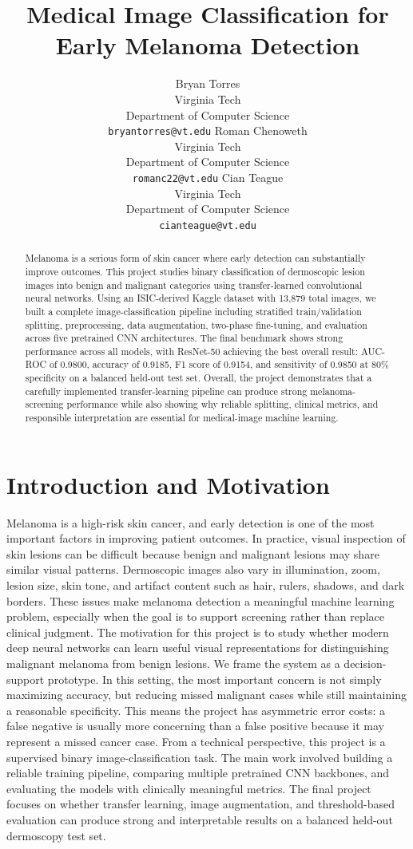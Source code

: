 \documentclass{article}
\title{Medical Image Classification for Early Melanoma Detection}
\author{%
  Bryan Torres \\
  Virginia Tech \\
  Department of Computer Science \\
  \texttt{bryantorres@vt.edu}
  \And
  Roman Chenoweth \\
  Virginia Tech \\
  Department of Computer Science \\
  \texttt{romanc22@vt.edu}
  \And
  Cian Teague \\
  Virginia Tech \\
  Department of Computer Science \\
  \texttt{cianteague@vt.edu}
}
\begin{document}
\maketitle
\begin{abstract}
Melanoma is a serious form of skin cancer where early detection can substantially improve outcomes.
This project studies binary classification of dermoscopic lesion images into benign and malignant
categories using transfer-learned convolutional neural networks. Using an ISIC-derived Kaggle
dataset with 13,879 total images, we built a complete image-classification pipeline including
stratified train/validation splitting, preprocessing, data augmentation, two-phase fine-tuning, and
evaluation across five pretrained CNN architectures. The final benchmark shows strong performance
across all models, with ResNet-50 achieving the best overall result: AUC-ROC of 0.9800, accuracy
of 0.9185, F1 score of 0.9154, and sensitivity of 0.9850 at 80\% specificity on a balanced held-out
test set. Overall, the project demonstrates that a carefully implemented transfer-learning pipeline
can produce strong melanoma-screening performance while also showing why reliable splitting,
clinical metrics, and responsible interpretation are essential for medical-image machine learning.
\end{abstract}
\section{Introduction and Motivation}
Melanoma is a high-risk skin cancer, and early detection is one of the most important factors in
improving patient outcomes. In practice, visual inspection of skin lesions can be difficult because
benign and malignant lesions may share similar visual patterns. Dermoscopic images also vary in
illumination, zoom, lesion size, skin tone, and artifact content such as hair, rulers, shadows, and
dark borders. These issues make melanoma detection a meaningful machine learning problem,
especially when the goal is to support screening rather than replace clinical judgment.
The motivation for this project is to study whether modern deep neural networks can learn useful
visual representations for distinguishing malignant melanoma from benign lesions. We frame the
system as a decision-support prototype. In this setting, the most important concern is not simply
maximizing accuracy, but reducing missed malignant cases while still maintaining a reasonable
specificity. This means the project has asymmetric error costs: a false negative is usually more
concerning than a false positive because it may represent a missed cancer case.
From a technical perspective, this project is a supervised binary image-classification task. The main
work involved building a reliable training pipeline, comparing multiple pretrained CNN backbones,
and evaluating the models with clinically meaningful metrics. The final project focuses on whether
transfer learning, image augmentation, and threshold-based evaluation can produce strong and
interpretable results on a balanced held-out dermoscopy test set.
\end{document}
